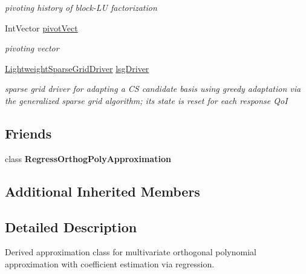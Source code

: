\begin{DoxyCompactItemize}
\begin{DoxyCompactList}\small\item\em pivoting history of block-\/\+LU factorization \end{DoxyCompactList}\item 
Int\+Vector \hyperlink{classPecos_1_1SharedRegressOrthogPolyApproxData_ac8b7e8ad73e976368c1ba13f4c03b658}{pivot\+Vect}\label{classPecos_1_1SharedRegressOrthogPolyApproxData_ac8b7e8ad73e976368c1ba13f4c03b658}

\begin{DoxyCompactList}\small\item\em pivoting vector \end{DoxyCompactList}\item 
\hyperlink{classPecos_1_1LightweightSparseGridDriver}{Lightweight\+Sparse\+Grid\+Driver} \hyperlink{classPecos_1_1SharedRegressOrthogPolyApproxData_a009f9c4be07adea9652a24086cd85b6a}{lsg\+Driver}\label{classPecos_1_1SharedRegressOrthogPolyApproxData_a009f9c4be07adea9652a24086cd85b6a}

\begin{DoxyCompactList}\small\item\em sparse grid driver for adapting a CS candidate basis using greedy adaptation via the generalized sparse grid algorithm; it\textquotesingle{}s state is reset for each response QoI \end{DoxyCompactList}\end{DoxyCompactItemize}
\subsection*{Friends}
\begin{DoxyCompactItemize}
\item 
class {\bfseries Regress\+Orthog\+Poly\+Approximation}\label{classPecos_1_1SharedRegressOrthogPolyApproxData_a7acecaa6278f4c25fb2eea8c89e541d9}

\end{DoxyCompactItemize}
\subsection*{Additional Inherited Members}


\subsection{Detailed Description}
Derived approximation class for multivariate orthogonal polynomial approximation with coefficient estimation via regression. 

